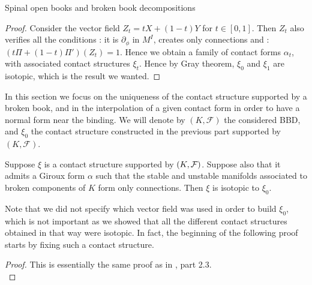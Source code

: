 \documentclass[../main.tex]{subfiles}
\begin{document}
\begin{section}{Spinal open books and broken book decompositions}
\begin{proof}
Consider the vector field $Z_t = tX + (1-t)Y$ for $t\in[0,1]$. Then $Z_t$ also verifies all the conditions : it is $\partial_\phi$ in $M^I$, creates only connections and : $(t\Pi + (1-t)\Pi')(Z_t) = 1$. Hence we obtain a family of contact forms $\alpha_t$, with associated contact structures $\xi_t$. Hence by Gray theorem, $\xi_0$ and $\xi_1$ are isotopic, which is the result we wanted.
\end{proof}

In this section we focus on the uniqueness of the contact structure supported by a broken book, and in the interpolation of a given contact form in order to have a normal form near the binding. We will denote by $(K,\mathcal{F})$ the considered BBD, and $\xi_0$ the contact structure constructed in the previous part supported by $(K,\mathcal{F})$. 

\begin{lemma}
Suppose $\xi$ is a contact structure supported by $(K,\mathcal{F})$. Suppose also that it admits a Giroux form $\alpha$ such that the stable and unstable manifolds associated to broken components of $K$ form only connections. Then $\xi$ is isotopic to $\xi_0$.
\end{lemma}

\begin{remark}
Note that we did not specify which vector field was used in order to build $\xi_0$, which is not important as we showed that all the different contact structures obtained in that way were isotopic. In fact, the beginning of the following proof starts by fixing such a contact structure. 
\end{remark}

\begin{proof}
This is essentially the same proof as in \cite{SOBD1}, part 2.3.\\


\end{proof}
\end{section}
\end{document}
